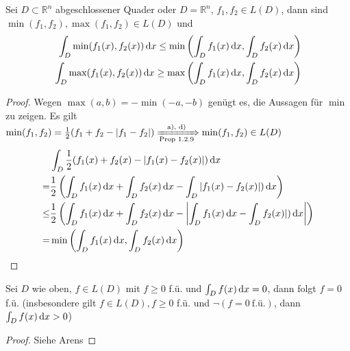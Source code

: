 \begin{korollar}
	Sei $D \subset \mathbb{R}^n$ abgeschlossener Quader oder $D=\mathbb{R}^n$, $f_1, f_2\in L(D)$, dann sind $\min(f_1,f_2), \max(f_1,f_2)\in L(D)$ und 
	\begin{align*}
		\int_{D} \min(f_1(x),f_2(x)) \,\text{d}x\leq\min\left(\int_{D} f_1(x) \,\text{d}x, \int_{D} f_2(x) \,\text{d}x\right)\\
		\int_{D} \max(f_1(x),f_2(x)) \,\text{d}x\geq\max\left(\int_{D} f_1(x) \,\text{d}x, \int_{D} f_2(x) \,\text{d}x\right)
	\end{align*}
\end{korollar}
\begin{proof}
	Wegen $\max(a,b) = -\min(-a, -b)$ genügt es, die Aussagen für $\min$ zu zeigen.
	Es gilt $\min(f_1, f_2)=\frac{1}{2}(f_1+f_2-|f_1-f_2|)\xRightarrow[\text{Prop 1.2.9}]{\text{a), d)}} \min(f_1,f_2)\in L(D)$
	\begin{align*}
		&\int_{D} \frac{1}{2}(f_1(x)+f_2(x)-|f_1(x)-f_2(x)|) \,\text{d}x \\
		= &\frac{1}{2}\left(\int_{D} f_1(x) \,\text{d}x+\int_{D} f_2(x) \,\text{d}x-\int_{D} |f_1(x)-f_2(x)|) \,\text{d}x\right)\\
		\leq &\frac{1}{2}\left(\int_{D} f_1(x) \,\text{d}x+\int_{D} f_2(x) \,\text{d}x-\left|\int_{D} f_1(x) \,\text{d}x-\int_{D} f_2(x)|) \,\text{d}x\right|\right)\\
		= &\min\left(\int_{D} f_1(x) \,\text{d}x, \int_{D} f_2(x) \,\text{d}x\right)
	\end{align*}
\end{proof}

\begin{proposition}
	Sei $D$ wie oben, $f\in L(D)$ mit $f\geq 0$ f.ü. und $\int_{D} f(x) \,\text{d}x=0$, dann folgt $f=0$ f.ü. (insbesondere gilt $f\in L(D), f\geq 0$ f.ü. und $\neg (f=0\ \text{f.ü.})$, dann $\int_{D} f(x) \,\text{d}x> 0$)
\end{proposition}
\begin{proof}
	Siehe Arens
\end{proof}

